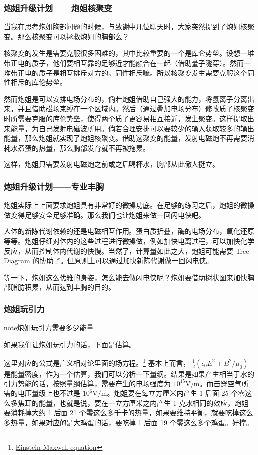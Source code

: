 \documentclass[letterpaper,10pt,english]{sphinxmanual}
\begin{document}
\subsubsection{炮姐升级计划——炮姐核聚变}
\label{superpower:id9}
当我在思考炮姐胸部问题的时候，与致谢中几位聊天时，大家突然提到了炮姐核聚变。那么核聚变可以拯救炮姐的胸部么？

核聚变的发生是需要克服很多困难的，其中比较重要的一个是库仑势垒。设想一堆带正电的质子，他们要相互靠的足够近才能融合在一起（借助量子隧穿）。然而一堆带正电的质子是相互排斥对方的，同性相斥嘛。所以核聚变发生需要克服这个同性相斥的库伦势垒。

然而炮姐是可以安排电场分布的，倘若炮姐借助自己强大的能力，将氢离子分离出来，并且借助磁场束缚在一个区域内。然后（通过叠加电场分布）修改质子核聚变时所需要克服的库伦势垒，使得两个质子更容易相互接近，发生聚变。这样提取出来能量，为自己发射电磁波所用。倘若合理安排可以要较少的输入获取较多的输出能量，那么炮姐就实现了炮姐核聚变。借助这聚变的能量，发射电磁炮不再需要消耗水煮蛋的热量，那么胸部发育就不再被拖累。

这样，炮姐只需要发射电磁炮之前或之后喝杯水，胸部从此傲人挺立。


\subsubsection{炮姐升级计划——专业丰胸}
\label{superpower:id10}
炮姐实际上上面要求炮姐具有非常好的微操功底。在足够的练习之后，炮姐的微操做变得足够安全足够准确。那么我们也让炮姐来做一回闪电侠吧。

人体的新陈代谢依赖的还是电磁相互作用。蛋白质折叠，酶的电场分布，氧化还原等等。炮姐仔细对体内的这些过程进行微操做，例如加快电离过程，可以加快化学反应，从而控制体内代谢的快慢。当然了，计算量如此之大，炮姐可能需要 Tree Diagram 的协助了。但原则上可以通过加快新陈代谢做一回闪电侠。

等一下，炮姐这么优雅的身姿，怎么能去做闪电侠呢？炮姐要借助树状图来加快胸部脂肪积累，从而达到丰胸的目的。


\subsubsection{炮姐玩引力}
\label{superpower:id11}
\begin{notice}{note}{炮姐玩引力需要多少能量}

如果我们让炮姐玩引力的话，下面是估算。

这里对应的公式是广义相对论里面的场方程。\footnote{
\href{https://en.wikipedia.org/wiki/Einstein\_field\_equations\#Einstein.E2.80.93Maxwell\_equations}{Einstein-Maxwell equation}
} 基本上而言， $\frac{1}{2}(\epsilon_0 E^2+B^2/\mu_0)$ 是能量密度，作为一个估算，我们可以分析一下量纲。结果是如果产生相当于水的引力势能的话，按照量纲估算，需要产生的电场强度为 $10^{15}\mathrm{V/m}$。而击穿空气所需的电压量级上也不过是 $10^6\mathrm{V/m}$。炮姐要在每立方厘米内产生 1 后面 25 个零这么多焦耳的能量，也就是说，要在一立方厘米之内产生 1 克水相同的效应，炮姐要消耗掉大约 1 后面 21 个零这么多千卡的热量，如果要维持平衡，就要吃掉这么多热量，如果对应的是大鸡蛋的话，要吃掉 1 后面 19 个零这么多个鸡蛋。好撑。
\end{notice}
\end{document}
